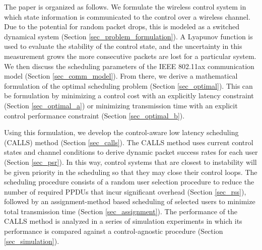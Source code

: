 The paper is organized as follows. We formulate the wireless control system in which state information is communicated to the control over a wireless channel. Due to the potential for random packet drops, this is modeled as a switched dynamical system (Section \ref{sec_problem_formulation}). A Lyapunov function is used to evaluate the stability of the control state, and the uncertainty in this measurement grows the more consecutive packets are lost for a particular system.  We then discuss the scheduling parameters of the IEEE 802.11ax communication model (Section \ref{sec_comm_model}).
From there, we derive a mathematical formulation of the optimal scheduling problem (Section \ref{sec_optimal}). This can be formulation by minimizing a control cost with an explicitly latency constraint (Section \ref{sec_optimal_a}) or minimizing transmission time with an explicit control performance constraint (Section \ref{sec_optimal_b}).

Using this formulation, we develop the control-aware low latency scheduling (CALLS) method (Section \ref{sec_calls}). The CALLS method uses current control states and channel conditions to derive dynamic packet success rates for each user (Section \ref{sec_psr}). In this way, control systems that are closest to instability will be given priority in the scheduling so that they may close their control loops. The scheduling procedure consists of a random user selection procedure to reduce the number of required PPDUs that incur significant overhead  (Section \ref{sec_rss}), followed by an assignment-method based scheduling of selected users to minimize total transmission time (Section \ref{sec_assignment}). The performance of the CALLS method is analyzed in a series of simulation experiments in which its performance is compared against a control-agnostic procedure (Section \ref{sec_simulation}). 
